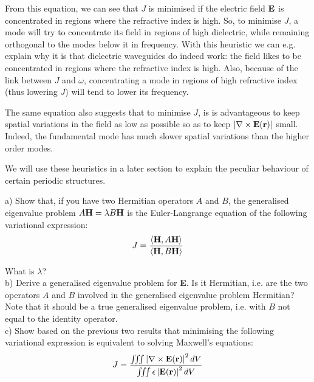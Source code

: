 From this equation, we can see that $J$ is minimised if the electric field ${\bf E}$ is concentrated in regions where the refractive index is high. So, to minimise $J$, a mode will try to concentrate its field in regions of high dielectric, while remaining orthogonal to the modes below it in frequency. With this heuristic we can e.g. explain why it is that dielectric waveguides do indeed work: the field likes to be concentrated in regions where the refractive index is high. Also, because of the link between $J$ and $\omega$, concentrating a mode in regions of high refractive index (thus lowering $J$) will tend to lower its frequency.

The same equation also suggests that to minimise $J$, is is advantageous to keep spatial variations in the field as low as possible so as to keep  $\left| \nabla \times {\bf E({\bf r})} \right |$ small. Indeed, the fundamental mode has much slower spatial variations than the higher order modes.

We will use these heuristics in a later section to explain the peculiar behaviour of certain periodic structures.

\begin{sidebar}
\begin{ex}
a) Show that, if you have two Hermitian operators $A$ and $B$, the generalised eigenvalue problem $A {\bf H} = \lambda B {\bf H}$ is the Euler-Langrange equation of the following variational expression: \\

$$J = \frac{\left\langle {\bf H} , A {\bf H}\right\rangle}{\left\langle {\bf H} , B {\bf H}\right\rangle}$$

What is $\lambda$? \\

b) Derive a generalised eigenvalue problem for {\bf E}. Is it Hermitian, i.e. are the two operators $A$ and $B$ involved in the generalised eigenvalue problem Hermitian? Note that it should be a true generalised eigenvalue problem, i.e. with $B$ not equal to the identity operator.  \\

c) Show based on the previous two results that minimising the following variational expression is equivalent to solving Maxwell's equations: \\

$$J=\frac{\iiint \left| \nabla \times {\bf E ({\bf r})} \right| ^2  dV} {\iiint \epsilon \left| {\bf E ({\bf r})} \right| ^2  dV}$$

\end{ex}
\end{sidebar}

